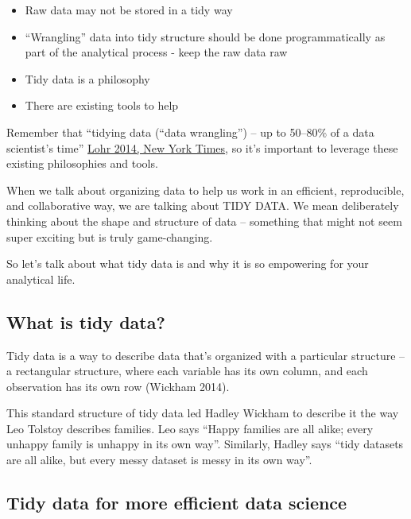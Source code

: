 \documentclass[
  letterpaper,
  DIV=11,
  numbers=noendperiod]{scrreprt}
\providecommand{\tightlist}{%
  \setlength{\itemsep}{0pt}\setlength{\parskip}{0pt}}
\begin{document}
\begin{itemize}
\tightlist
\item
  Raw data may not be stored in a tidy way
\item
  ``Wrangling'' data into tidy structure should be done programmatically
  as part of the analytical process - keep the raw data raw
\item
  Tidy data is a philosophy
\item
  There are existing tools to help
\end{itemize}

Remember that ``tidying data (``data wrangling'') -- up to 50--80\% of a
data scientist's time''
\href{https://www.nytimes.com/2014/08/18/technology/for-big-data-scientists-hurdle-to-insights-is-janitor-work.html}{Lohr
2014, New York Times}, so it's important to leverage these existing
philosophies and tools.

When we talk about organizing data to help us work in an efficient,
reproducible, and collaborative way, we are talking about TIDY DATA. We
mean deliberately thinking about the shape and structure of data --
something that might not seem super exciting but is truly game-changing.

So let's talk about what tidy data is and why it is so empowering for
your analytical life.

\hypertarget{what-is-tidy-data}{%
\subsection{What is tidy data?}\label{what-is-tidy-data}}

Tidy data is a way to describe data that's organized with a particular
structure -- a rectangular structure, where each variable has its own
column, and each observation has its own row (Wickham 2014).

This standard structure of tidy data led Hadley Wickham to describe it
the way Leo Tolstoy describes families. Leo says ``Happy families are
all alike; every unhappy family is unhappy in its own way''. Similarly,
Hadley says ``tidy datasets are all alike, but every messy dataset is
messy in its own way''.

\hypertarget{tidy-data-for-more-efficient-data-science}{%
\subsection{Tidy data for more efficient data
science}\label{tidy-data-for-more-efficient-data-science}}
\end{document}
